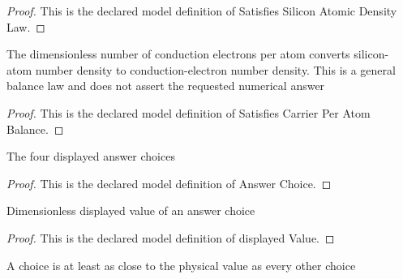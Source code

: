 \begin{proof}
  This is the declared model definition of Satisfies Silicon Atomic Density Law.
\end{proof}
\begin{definition}
  \label{def:physics:phyx-mini-0626:phyxminiproblems-problemphyxmini0626-satisfiescarrierperatombalance}
  The dimensionless number of conduction electrons per atom converts silicon- atom number density to conduction-electron number density. This is a general balance law and does not assert the requested numerical answer
\end{definition}
\begin{proof}
  This is the declared model definition of Satisfies Carrier Per Atom Balance.
\end{proof}
\begin{definition}
  \label{def:physics:phyx-mini-0626:phyxminiproblems-problemphyxmini0626-answerchoice}
  The four displayed answer choices
\end{definition}
\begin{proof}
  This is the declared model definition of Answer Choice.
\end{proof}
\begin{definition}
  \label{def:physics:phyx-mini-0626:phyxminiproblems-problemphyxmini0626-answerchoice-displayedvalue}
  Dimensionless displayed value of an answer choice
\end{definition}
\begin{proof}
  This is the declared model definition of displayed Value.
\end{proof}
\begin{definition}
  \label{def:physics:phyx-mini-0626:phyxminiproblems-problemphyxmini0626-isclosestanswer}
  A choice is at least as close to the physical value as every other choice
\end{definition}
